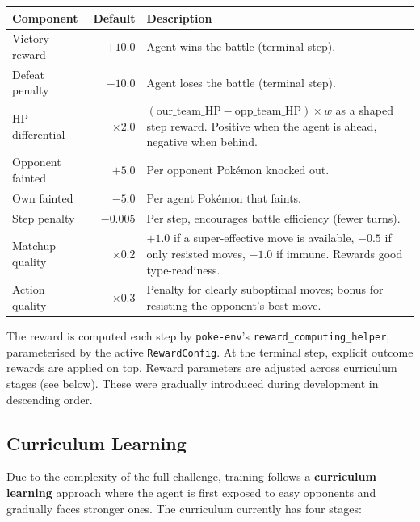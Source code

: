 \begin{center}
\small
\begin{tabularx}{\textwidth}{l r X}
  \toprule
  \textbf{Component} & \textbf{Default} & \textbf{Description} \\
  \midrule
  Victory reward     & $+10.0$  & Agent wins the battle (terminal step). \\
  Defeat penalty     & $-10.0$  & Agent loses the battle (terminal step). \\
  HP differential    & $\times 2.0$ &
    $(\text{our\_team\_HP} - \text{opp\_team\_HP}) \times w$ as a shaped
    step reward.  Positive when the agent is ahead, negative when behind. \\
  Opponent fainted   & $+5.0$   & Per opponent Pok\'{e}mon knocked out. \\
  Own fainted        & $-5.0$   & Per agent Pok\'{e}mon that faints. \\
  Step penalty       & $-0.005$ & Per step, encourages battle efficiency
                                    (fewer turns). \\
  Matchup quality    & $\times 0.2$ &
    $+1.0$ if a super-effective move is available, $-0.5$ if only resisted
    moves, $-1.0$ if immune.  Rewards good type-readiness. \\
  Action quality     & $\times 0.3$ &
    Penalty for clearly suboptimal moves; bonus for resisting the opponent's
    best move. \\
  \bottomrule
\end{tabularx}
\end{center}

The reward is computed each step by \texttt{poke-env}'s
\texttt{reward\_computing\_helper}, parameterised by the active
\texttt{RewardConfig}.  At the terminal step, explicit outcome rewards are
applied on top.  Reward parameters are adjusted across curriculum stages (see
below). These were gradually introduced during development in descending order.

\subsection{Curriculum Learning}
\label{sec:curriculum}

Due to the complexity of the full challenge, training follows a \textbf{curriculum
learning} approach where the agent is first exposed to easy opponents and
gradually faces stronger ones.  The curriculum currently has four stages:


